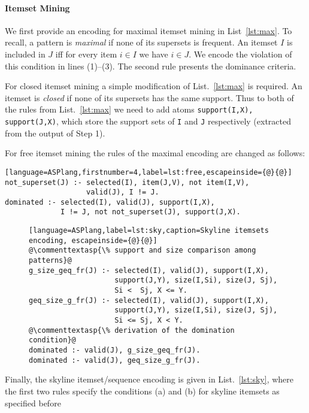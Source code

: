 \paragraph{Itemset Mining} We first provide an encoding for maximal itemset mining in List~\ref{lst:max}. To recall, a pattern is \emph{maximal} if none of its supersets is frequent. An itemset $I$ is included in $J$ iff for every item $i\in I$ we have  $i\in J$. We encode the violation of this condition in lines (1)--(3). The second rule presents the dominance criteria.

For closed itemset mining a simple modification of List.~\ref{lst:max} is required. An itemset is \emph{closed} if none of its supersets has the same support. Thus to both of the rules from List.~\ref{lst:max} we need to add atoms \texttt{support(I,X), support(J,X)}, which store the support sets of \texttt{I} and \texttt{J} respectively (extracted from the output of Step 1).  


For free itemset mining the rules of the maximal encoding are changed as follows:
\medskip

\small{\begin{lstlisting}[language=ASPlang,firstnumber=4,label=lst:free,escapeinside={@}{@}]
not_superset(J) :- selected(I), item(J,V), not item(I,V), 
                   valid(J), I != J.
dominated :- selected(I), valid(J), support(I,X),
             I != J, not not_superset(J), support(J,X).
\end{lstlisting}}



\begin{figure}[t]
\small{\begin{lstlisting}[language=ASPlang,label=lst:sky,caption=Skyline itemsets encoding, escapeinside={@}{@}]
@\commenttextasp{\% support and size comparison among patterns}@
g_size_geq_fr(J) :- selected(I), valid(J), support(I,X), 
                    support(J,Y), size(I,Si), size(J, Sj), 
                    Si <  Sj, X <= Y. 
geq_size_g_fr(J) :- selected(I), valid(J), support(I,X), 
                    support(J,Y), size(I,Si), size(J, Sj), 
                    Si <= Sj, X < Y. 
@\commenttextasp{\% derivation of the domination condition}@
dominated :- valid(J), g_size_geq_fr(J). 
dominated :- valid(J), geq_size_g_fr(J). 
\end{lstlisting}}
\end{figure}
\normalsize{Finally, the skyline itemset/sequence encoding is given in List.~\ref{lst:sky}, where the first two rules specify the conditions (a) and (b) for skyline itemsets as specified before}

